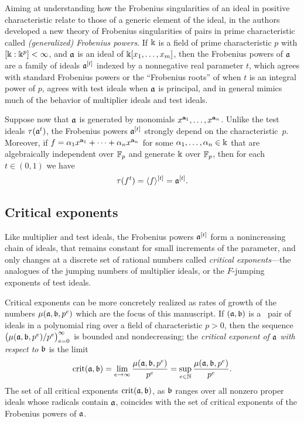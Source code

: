 \documentclass{amsart}
\begin{document}
Aiming at understanding how the Frobenius singularities of an ideal in positive characteristic relate to those of a generic element of the ideal, in \cite{hernandez+etal.frobenius_powers} the authors developed a new theory of Frobenius singularities of pairs in prime characteristic called \emph{\textup{(}generalized\textup{)} Frobenius powers}. 
If $\Bbbk$ is a field of prime characteristic $p$ with $[\Bbbk:\Bbbk^p] <\infty$, and $\mathfrak{a}$ is an ideal of $\Bbbk[x_1, \ldots, x_m]$, then the Frobenius powers of $\mathfrak{a}$ are a family of ideals $\mathfrak{a}^{[t]}$ indexed by a nonnegative real parameter $t$, which agrees with standard Frobenius powers or the ``Frobenius roots'' of \cite{blickle+mustata+smith.discr_rat_FPTs} when $t$ is an integral power of $p$, agrees with test ideals when $\mathfrak{a}$ is principal, and in general mimics much of the behavior of multiplier ideals and test ideals.

Suppose now that $\mathfrak{a}$ is generated by monomials $x^{\mathbf{a}_1},\ldots,x^{\mathbf{a}_n}$.
Unlike the test ideals $\tau(\mathfrak{a}^t)$, the Frobenius powers $\mathfrak{a}^{[t]}$ strongly depend on the characteristic~$p$.
Moreover, if $f=\alpha_1x^{\mathbf{a}_1}+\cdots+\alpha_nx^{\mathbf{a}_n}$ for some $\alpha_1,\ldots,\alpha_n \in \Bbbk$ that are algebraically independent over $\mathbb{F}_p$ and generate $\Bbbk$ over $\mathbb{F}_p$, then for each $t \in (0,1)$ we have
\[\tau(f^t) = \langle f \rangle^{[t]} = \mathfrak{a}^{[t]}.\]

\subsection{Critical exponents}

Like multiplier and test ideals, the Frobenius powers $\mathfrak{a}^{[t]}$ form a nonincreasing chain of ideals, that remains constant for small increments of the parameter, and only changes at a discrete set of rational numbers called \emph{critical exponents}---the analogues of the jumping numbers of multiplier ideals, or the $F$-jumping exponents of test ideals.

Critical exponents can be more concretely realized as rates of growth of the numbers $\mu(\mathfrak{a},\mathfrak{b},p^e)$ which are the focus of this manuscript.
If $(\mathfrak{a},\mathfrak{b})$ is a \compatible\ pair of ideals in a polynomial ring over a field of characteristic $p>0$, then the sequence $\big(\mu(\mathfrak{a},\mathfrak{b},p^e)/p^e\big)_{e=0}^\infty$ is bounded and nondecreasing; the \emph{critical exponent of $\mathfrak{a}$ with respect to $\mathfrak{b}$} is the limit
\[
   \operatorname{crit}(\mathfrak{a},\mathfrak{b}) = \lim_{e\to \infty} \frac{\mu(\mathfrak{a},\mathfrak{b},p^e)}{p^e}
   = \sup_{e\in \mathbb{N}} \frac{\mu(\mathfrak{a},\mathfrak{b},p^e)}{p^e}.
\]
The set of all critical exponents $\operatorname{crit}(\mathfrak{a},\mathfrak{b})$, as $\mathfrak{b}$ ranges over all nonzero proper ideals whose radicals contain $\mathfrak{a}$, coincides with the set of critical exponents of the Frobenius powers of $\mathfrak{a}$.
\end{document}
